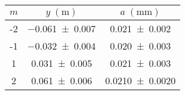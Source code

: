 \begin{tabular}{cc|c}
\toprule
$m$ &    $y \; (\si{\m})$ &    $a \; (\si{\mm})$ \\
\midrule
 -2 & \num{-0.061+-0.007} &   \num{0.021+-0.002} \\
 -1 & \num{-0.032+-0.004} &   \num{0.020+-0.003} \\
  1 &  \num{0.031+-0.005} &   \num{0.021+-0.003} \\
  2 &  \num{0.061+-0.006} & \num{0.0210+-0.0020} \\
\bottomrule
\end{tabular}
